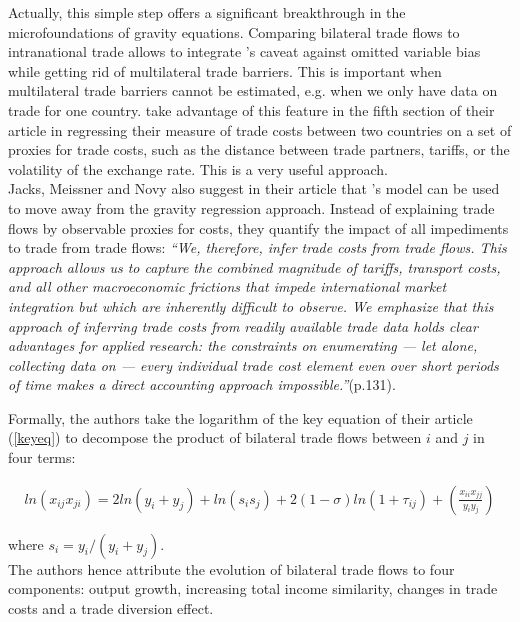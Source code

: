 \documentclass{article}
\begin{document}
Actually, this simple step offers a significant breakthrough in the microfoundations of gravity equations. 
Comparing bilateral trade flows to intranational trade allows to integrate \cite{AW2003}'s caveat against omitted variable bias while getting rid of multilateral trade barriers.
This is important when multilateral trade barriers cannot be estimated, e.g. when we only have data on trade for one country. \cite{JMN2011} take advantage of this feature in the fifth section of their article in regressing their measure of trade costs between two countries on a set of proxies for trade costs, such as the distance between trade partners, tariffs, or the volatility of the exchange rate. This is a very useful approach.\\

Jacks, Meissner and Novy also suggest in their article that \cite{AW2003}'s model can be used to move away from the gravity regression approach. Instead of explaining trade flows by observable proxies for costs, they quantify the impact of all impediments to trade from trade flows:
\emph{``We, therefore, infer trade costs from trade flows.
This approach allows us to capture the combined magnitude of tariffs, transport costs, and all other macroeconomic frictions that impede international market integration but which are inherently difficult to observe.
We emphasize that this approach of inferring trade costs from readily available trade data holds clear advantages for applied research: the constraints on enumerating — let alone, collecting data on — every individual trade cost element even over short periods of time makes a direct accounting approach impossible.''}(p.131).

Formally, the authors take the logarithm of the key equation of their article (\ref{keyeq}) to decompose the product of bilateral trade flows between $i$ and $j$ in four terms:

\begin{eqnarray}
ln (x_{ij}x_{ji})= 2 ln(y_i + y_j)+ ln (s_i s_j) + 2(1-\sigma)ln(1+\tau_{ij})+ \left(\frac{x_{ii} x_{jj}}{y_i y_j}\right)
\end{eqnarray}

where $s_i=y_i/(y_i+y_j)$.\\

The authors hence attribute the evolution of bilateral trade flows to four components: output growth, increasing total income similarity, changes in trade costs and a trade diversion effect.
\end{document}
